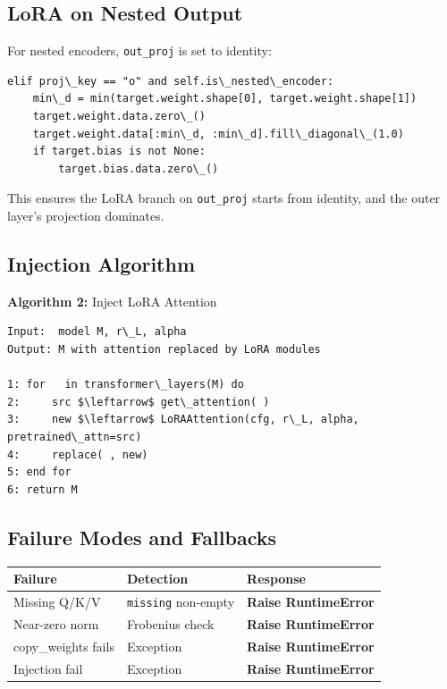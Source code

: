 \subsection{LoRA on Nested Output}

For nested encoders, \texttt{out\_proj} is set to identity:

\begin{lstlisting}
elif proj\_key == "o" and self.is\_nested\_encoder:
    min\_d = min(target.weight.shape[0], target.weight.shape[1])
    target.weight.data.zero\_()
    target.weight.data[:min\_d, :min\_d].fill\_diagonal\_(1.0)
    if target.bias is not None:
        target.bias.data.zero\_()
\end{lstlisting}

This ensures the LoRA branch on \texttt{out\_proj} starts from identity, and the 
outer layer's projection dominates.

\subsection{Injection Algorithm}

\textbf{Algorithm 2:} Inject LoRA Attention
\begin{lstlisting}
Input:  model M, r\_L, alpha
Output: M with attention replaced by LoRA modules

1: for   in transformer\_layers(M) do
2:     src $\leftarrow$ get\_attention( )
3:     new $\leftarrow$ LoRAAttention(cfg, r\_L, alpha, pretrained\_attn=src)
4:     replace( , new)
5: end for
6: return M
\end{lstlisting}

\subsection{Failure Modes and Fallbacks}

\begin{table}[H]
\centering
\small
\begin{tabular}{lll}
\toprule
\textbf{Failure} & \textbf{Detection} & \textbf{Response} \\
\midrule
Missing Q/K/V & \texttt{missing} non-empty & \textbf{Raise RuntimeError} \\
Near-zero norm & Frobenius check & \textbf{Raise RuntimeError} \\
copy\_weights fails & Exception & \textbf{Raise RuntimeError} \\
Injection fail & Exception & \textbf{Raise RuntimeError} \\
\bottomrule
\end{tabular}
\end{table}

